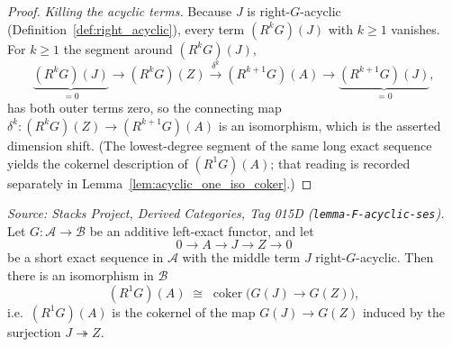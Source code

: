 \begin{proof}
  \emph{Killing the acyclic terms.} Because \(J\) is right-\(G\)-acyclic
  (Definition~\ref{def:right_acyclic}), every term \((R^k G)(J)\) with \(k \geq 1\)
  vanishes. For \(k \geq 1\) the segment around \((R^k G)(J)\),
  \[
    \underbrace{(R^{k} G)(J)}_{=0} \to (R^{k} G)(Z)
      \xrightarrow{\ \delta^k\ } (R^{k+1} G)(A) \to \underbrace{(R^{k+1} G)(J)}_{=0},
  \]
  has both outer terms zero, so the connecting map
  \(\delta^k : (R^{k} G)(Z) \to (R^{k+1} G)(A)\) is an isomorphism, which is the
  asserted dimension shift. (The lowest-degree segment of the same long exact
  sequence yields the cokernel description of \((R^1 G)(A)\); that reading is
  recorded separately in Lemma~\ref{lem:acyclic_one_iso_coker}.)
\end{proof}

\begin{lemma}\leanok
  \label{lem:acyclic_one_iso_coker}
  \textit{Source: Stacks Project, Derived Categories, Tag 015D
  (\texttt{lemma-F-acyclic-ses}).}
  Let \(G : \mathcal{A} \to \mathcal{B}\) be an additive left-exact functor, and let
  \[
    0 \longrightarrow A \longrightarrow J \longrightarrow Z \longrightarrow 0
  \]
  be a short exact sequence in \(\mathcal{A}\) with the middle term \(J\)
  right-\(G\)-acyclic. Then there is an isomorphism in \(\mathcal{B}\)
  \[
    (R^{1} G)(A) \;\cong\; \operatorname{coker}\bigl(G(J) \to G(Z)\bigr),
  \]
  i.e.\ \((R^1 G)(A)\) is the cokernel of the map \(G(J) \to G(Z)\) induced by the
  surjection \(J \twoheadrightarrow Z\).
\end{lemma}

